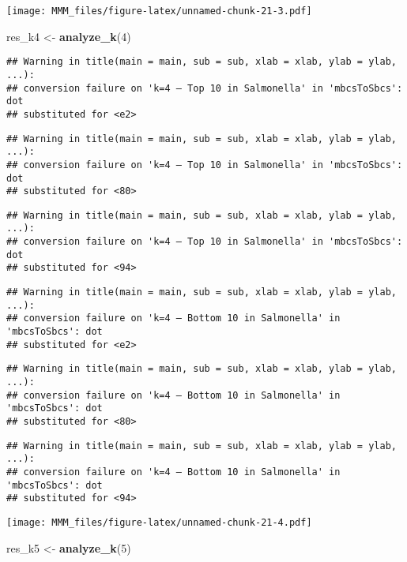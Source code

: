 \documentclass[
]{article}
\newenvironment{Shaded}{\begin{snugshade}}{\end{snugshade}}
\newcommand{\DecValTok}[1]{\textcolor[rgb]{0.00,0.00,0.81}{#1}}
\newcommand{\FunctionTok}[1]{\textcolor[rgb]{0.13,0.29,0.53}{\textbf{#1}}}
\newcommand{\NormalTok}[1]{#1}
\newcommand{\OtherTok}[1]{\textcolor[rgb]{0.56,0.35,0.01}{#1}}
\begin{document}
\texttt{[image: MMM\_files/figure-latex/unnamed-chunk-21-3.pdf]}

\begin{Shaded}
\begin{Highlighting}[]
\NormalTok{res\_k4 }\OtherTok{\textless{}{-}} \FunctionTok{analyze\_k}\NormalTok{(}\DecValTok{4}\NormalTok{)}
\end{Highlighting}
\end{Shaded}

\begin{verbatim}
## Warning in title(main = main, sub = sub, xlab = xlab, ylab = ylab, ...):
## conversion failure on 'k=4 — Top 10 in Salmonella' in 'mbcsToSbcs': dot
## substituted for <e2>
\end{verbatim}

\begin{verbatim}
## Warning in title(main = main, sub = sub, xlab = xlab, ylab = ylab, ...):
## conversion failure on 'k=4 — Top 10 in Salmonella' in 'mbcsToSbcs': dot
## substituted for <80>
\end{verbatim}

\begin{verbatim}
## Warning in title(main = main, sub = sub, xlab = xlab, ylab = ylab, ...):
## conversion failure on 'k=4 — Top 10 in Salmonella' in 'mbcsToSbcs': dot
## substituted for <94>
\end{verbatim}

\begin{verbatim}
## Warning in title(main = main, sub = sub, xlab = xlab, ylab = ylab, ...):
## conversion failure on 'k=4 — Bottom 10 in Salmonella' in 'mbcsToSbcs': dot
## substituted for <e2>
\end{verbatim}

\begin{verbatim}
## Warning in title(main = main, sub = sub, xlab = xlab, ylab = ylab, ...):
## conversion failure on 'k=4 — Bottom 10 in Salmonella' in 'mbcsToSbcs': dot
## substituted for <80>
\end{verbatim}

\begin{verbatim}
## Warning in title(main = main, sub = sub, xlab = xlab, ylab = ylab, ...):
## conversion failure on 'k=4 — Bottom 10 in Salmonella' in 'mbcsToSbcs': dot
## substituted for <94>
\end{verbatim}

\texttt{[image: MMM\_files/figure-latex/unnamed-chunk-21-4.pdf]}

\begin{Shaded}
\begin{Highlighting}[]
\NormalTok{res\_k5 }\OtherTok{\textless{}{-}} \FunctionTok{analyze\_k}\NormalTok{(}\DecValTok{5}\NormalTok{)}
\end{Highlighting}
\end{Shaded}
\end{document}

